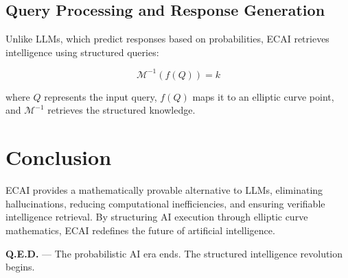 \documentclass{article}
\begin{document}
\subsection{Query Processing and Response Generation}

Unlike LLMs, which predict responses based on probabilities, ECAI retrieves intelligence using structured queries:

\begin{equation}
\mathcal{M}^{-1}(f(Q)) = k
\end{equation}

where $Q$ represents the input query, $f(Q)$ maps it to an elliptic curve point, and $\mathcal{M}^{-1}$ retrieves the structured knowledge.

\section{Conclusion}

ECAI provides a mathematically provable alternative to LLMs, eliminating hallucinations, reducing computational inefficiencies, and ensuring verifiable intelligence retrieval. By structuring AI execution through elliptic curve mathematics, ECAI redefines the future of artificial intelligence.

\textbf{Q.E.D.} — The probabilistic AI era ends. The structured intelligence revolution begins.
\end{document}
